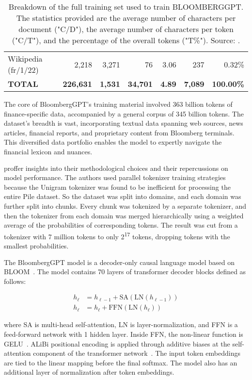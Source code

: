 \begin{table}[!h]
\begin{tabularx}{\textwidth}{lrrrrrr}
		Wikipedia (fr/1/22) & 2,218            & 3,271          & 76              & 3.06          & 237            & 0.32\%            \\
		\textbf{TOTAL}      & \textbf{226,631} & \textbf{1,531} & \textbf{34,701} & \textbf{4.89} & \textbf{7,089} & \textbf{100.00\%} \\
		\bottomrule
	\end{tabularx}
	\caption{Breakdown of the full training set used to train BLOOMBERGGPT. The statistics provided are the average number of characters per document ("C/D"), the average number of characters per token ("C/T"), and the percentage of the overall tokens ("T\%"). Source: \textcite{wu2023bloomberggpt}.}
	\label{tab:training_set}
\end{table}

The core of BloombergGPT's training material involved 363 billion tokens of finance-specific data, accompanied by a general corpus of 345 billion tokens.
The dataset's breadth is vast, incorporating textual data spanning web sources, news articles, financial reports, and proprietary content from Bloomberg terminals.
This diversified data portfolio enables the model to expertly navigate the financial lexicon and nuances.

\textcite{wu2023bloomberggpt} proffer insights into their methodological choices and their repercussions on model performance.
The authors used parallel tokenizer training strategies because the Unigram tokenizer was found to be inefficient for processing the entire Pile dataset.
So the dataset was split into domains, and each domain was further split into chunks.
Every chunk was tokenized by a separate tokenizer, and then the tokenizer from each domain was merged hierarchically using a weighted average of the probabilities of corresponding tokens.
The result was cut from a tokenizer with 7 million tokens to only 2\textsuperscript{17} tokens, dropping tokens with the smallest probabilities.

The BloombergGPT model is a decoder-only causal language model based on BLOOM~\cite{workshop2023bloom}.
The model contains 70 layers of transformer decoder blocks defined as follows:

\begin{align*}
	h_{\ell} & = h_{\ell-1} + \text{SA}(\text{LN}(h_{\ell-1})) \\
	h_{\ell} & = h_{\ell} + \text{FFN}(\text{LN}(h_{\ell}))
\end{align*}

\noindent where SA is multi-head self-attention, LN is layer-normalization, and FFN is a feed-forward network with 1 hidden layer.
Inside FFN, the non-linear function is GELU~\cite{hendrycks2016gelu}.
ALiBi positional encoding is applied through additive biases at the self-attention component of the transformer network~\cite{lescao2022milliongpuhours}. The input token embeddings are tied to the linear mapping before the final softmax.
The model also has an additional layer of normalization after token embeddings.

